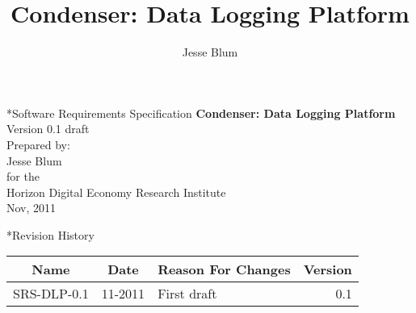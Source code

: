\documentclass[11pt,a4paper,draft]{article}
\author{Jesse Blum}
\title{Condenser: Data Logging Platform}
\begin{document}
\thispagestyle{empty}
\begin{center}
    \begin{section}*{Software Requirements Specification}     
    \textbf{Condenser: Data Logging Platform}\\
    \medskip
    Version 0.1 draft\\    
    \bigskip
    Prepared by:\\
    Jesse Blum\\
    for the\\
    Horizon Digital Economy Research Institute\\
    Nov, 2011
    \end{section}
\end{center}   
    \bigskip	
    \bigskip
    \bigskip
\begin{center}
    \begin{section}*{Revision History}
    \begin{tabular}{|c|c|l|r|}
    \hline
    \textbf{Name}
    &
    \textbf{Date}
    &
    \textbf{Reason For Changes}
    &
    \textbf{Version}\\
    \hline
    SRS-DLP-0.1&11-2011&First draft&0.1\\
    \hline
    \end{tabular}
    \end{section}
 \end{center} 
    \newpage
    \pagestyle{myheadings}
    \tableofcontents
    \newpage
    
	
	


\end{document}

